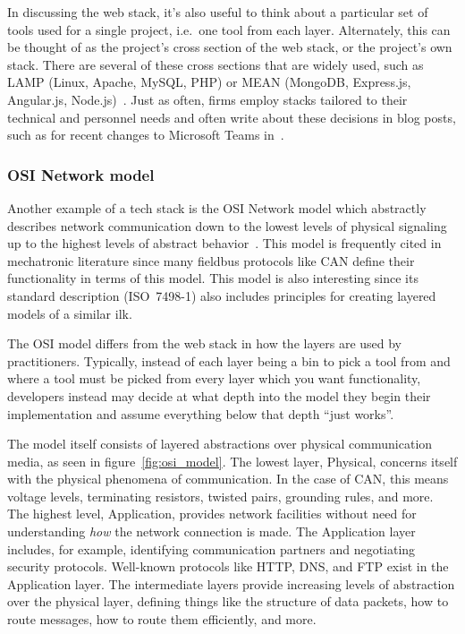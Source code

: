 \documentclass[english,12pt,a4paper,pdftex,eng,utf8]{aaltothesis}
\begin{document}
In discussing the web stack, it's also useful to think about a particular set of tools used for a single project, i.e.\ one tool from each layer. Alternately, this can be thought of as the project's cross section of the web stack, or the project's own stack. There are several of these cross sections that are widely used, such as LAMP (Linux, Apache, MySQL, PHP) or MEAN (MongoDB, Express.js, Angular.js, Node.js)~\cite{PranamStack2017}. Just as often, firms employ stacks tailored to their technical and personnel needs and often write about these decisions in blog posts, such as for recent changes to Microsoft Teams in~\cite{Singh2023}.

\subsubsection{OSI Network model}

Another example of a tech stack is the OSI Network model which abstractly describes network communication down to the lowest levels of physical signaling up to the highest levels of abstract behavior~\cite{ISO7498-1}. This model is frequently cited in mechatronic literature since many fieldbus protocols like CAN define their functionality in terms of this model. This model is also interesting since its standard description (ISO~7498-1) also includes principles for creating layered models of a similar ilk.

The OSI model differs from the web stack in how the layers are used by practitioners. Typically, instead of each layer being a bin to pick a tool from and where a tool must be picked from every layer which you want functionality, developers instead may decide at what depth into the model they begin their implementation and assume everything below that depth ``just works''.

The model itself consists of layered abstractions over physical communication media, as seen in figure~\ref{fig:osi_model}. The lowest layer, Physical, concerns itself with the physical phenomena of communication. In the case of CAN, this means voltage levels, terminating resistors, twisted pairs, grounding rules, and more. The highest level, Application, provides network facilities without need for understanding \textit{how} the network connection is made. The Application layer includes, for example, identifying communication partners and negotiating security protocols. Well-known protocols like HTTP, DNS, and FTP exist in the Application layer. The intermediate layers provide increasing levels of abstraction over the physical layer, defining things like the structure of data packets, how to route messages, how to route them efficiently, and more.
\end{document}
